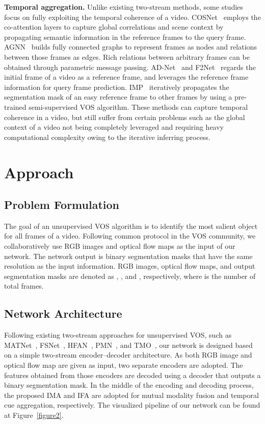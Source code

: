 \documentclass[10pt,twocolumn,letterpaper]{article}
\begin{document}
\vspace{1mm}
\noindent\textbf{Temporal aggregation.} Unlike existing two-stream methods, some studies focus on fully exploiting the temporal coherence of a video. COSNet~\cite{COSNet} employs the co-attention layers to capture global correlations and scene context by propagating semantic information in the reference frames to the query frame. AGNN~\cite{AGNN} builds fully connected graphs to represent frames as nodes and relations between those frames as edges. Rich relations between arbitrary frames can be obtained through parametric message passing. AD-Net~\cite{AD-Net} and F2Net~\cite{F2Net} regards the initial frame of a video as a reference frame, and leverages the reference frame information for query frame prediction. IMP~\cite{IMP} iteratively propagates the segmentation mask of an easy reference frame to other frames by using a pre-trained semi-supervised VOS algorithm. These methods can capture temporal coherence in a video, but still suffer from certain problems such as the global context of a video not being completely leveraged and requiring heavy computational complexity owing to the iterative inferring process. 



\section{Approach}
\subsection{Problem Formulation}
The goal of an unsupervised VOS algorithm is to identify the most salient object for all frames of a video. Following common protocol in the VOS community, we collaboratively use RGB images and optical flow maps as the input of our network. The network output is binary segmentation masks that have the same resolution as the input information. RGB images, optical flow maps, and output segmentation masks are denoted as , , and , respectively, where  is the number of total frames.


\subsection{Network Architecture}
Following existing two-stream approaches for unsupervised VOS, such as MATNet~\cite{MATNet}, FSNet~\cite{FSNet}, HFAN~\cite{HFAN}, PMN~\cite{PMN}, and TMO~\cite{TMO}, our network is designed based on a simple two-stream encoder--decoder architecture. As both RGB image and optical flow map are given as input, two separate encoders are adopted. The features obtained from those encoders are decoded using a decoder that outputs a binary segmentation mask. In the middle of the encoding and decoding process, the proposed IMA and IFA are adopted for mutual modality fusion and temporal cue aggregation, respectively. The visualized pipeline of our network can be found at Figure~\ref{figure2}.
\end{document}
